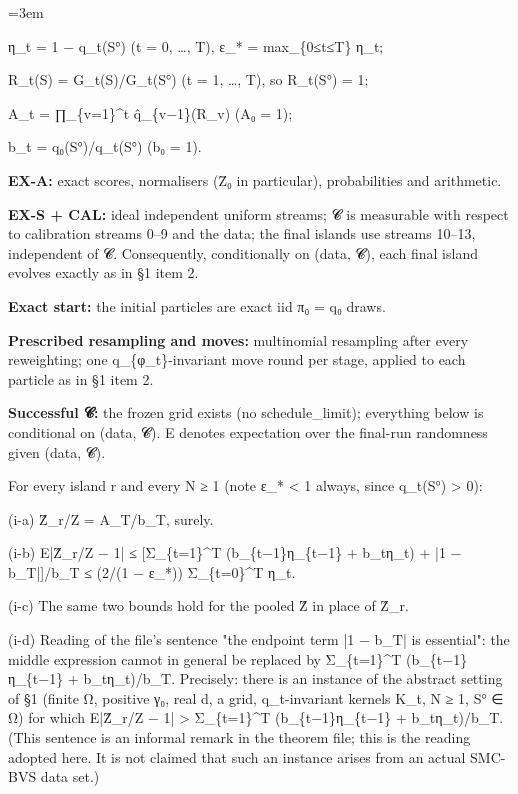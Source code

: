 \documentclass[11pt]{report}
\newenvironment{mdblock}{\begingroup\mdfont\raggedright\setlength{\parindent}{0pt}\setlength{\parskip}{0.55em}\emergencystretch=3em}{\par\endgroup}
\newcommand{\mdhead}[2]{\par\vspace{0.7em}\noindent{\bfseries\ifcase#1\or\large\or\normalsize\or\normalsize\or\small\or\small\or\small\fi #2}\par\nopagebreak\vspace{0.1em}}
\begin{document}
\begin{mdblock}
\begin{mdbul}
\begin{mdbul}
\item η\_t = 1 − q\_t(S°) (t = 0, …, T), ε\_* = max\_\{0≤t≤T\} η\_t;
\item R\_t(S) = G\_t(S)/G\_t(S°) (t = 1, …, T), so R\_t(S°) = 1;
\item A\_t = ∏\_\{v=1\}\textasciicircum{}t q̂\_\{v−1\}(R\_v) (A₀ = 1);
\item b\_t = q₀(S°)/q\_t(S°) (b₀ = 1).
\end{mdbul}
\end{mdbul}

\mdhead{2}{2. Hypotheses}

\begin{mdbul}
\item \textbf{EX-A:} exact scores, normalisers (Z̄₀ in particular), probabilities and arithmetic.
\item \textbf{EX-S + CAL:} ideal independent uniform streams; 𝓒 is measurable with respect to calibration streams 0–9 and the data; the final islands use streams 10–13, independent of 𝓒. Consequently, conditionally on (data, 𝓒), each final island evolves exactly as in §1 item 2.
\item \textbf{Exact start:} the initial particles are exact iid π₀ = q₀ draws.
\item \textbf{Prescribed resampling and moves:} multinomial resampling after every reweighting; one q\_\{φ\_t\}-invariant move round per stage, applied to each particle as in §1 item 2.
\item \textbf{Successful 𝓒:} the frozen grid exists (no {\mdtt schedule\_\allowbreak{}limit}); everything below is conditional on (data, 𝓒). E denotes expectation over the final-run randomness given (data, 𝓒).
\end{mdbul}

\mdhead{2}{3. Conclusion (to prove)}

For every island r and every N ≥ 1 (note ε\_* < 1 always, since q\_t(S°) > 0):

(i-a) Ẑ\_r/Z = A\_T/b\_T, surely.

(i-b) E|Ẑ\_r/Z − 1| ≤ [Σ\_\{t=1\}\textasciicircum{}T (b\_\{t−1\}η\_\{t−1\} + b\_tη\_t) + |1 − b\_T|]/b\_T ≤ (2/(1 − ε\_*)) Σ\_\{t=0\}\textasciicircum{}T η\_t.

(i-c) The same two bounds hold for the pooled Ẑ in place of Ẑ\_r.

(i-d) Reading of the file's sentence "the endpoint term |1 − b\_T| is essential": the middle expression cannot in general be replaced by Σ\_\{t=1\}\textasciicircum{}T (b\_\{t−1\}η\_\{t−1\} + b\_tη\_t)/b\_T. Precisely: there is an instance of the abstract setting of §1 (finite Ω, positive γ₀, real d, a grid, q\_t-invariant kernels K\_t, N ≥ 1, S° ∈ Ω) for which E|Ẑ\_r/Z − 1| > Σ\_\{t=1\}\textasciicircum{}T (b\_\{t−1\}η\_\{t−1\} + b\_tη\_t)/b\_T. (This sentence is an informal remark in the theorem file; this is the reading adopted here. It is not claimed that such an instance arises from an actual SMC-BVS data set.)


\end{mdblock}
\end{document}
